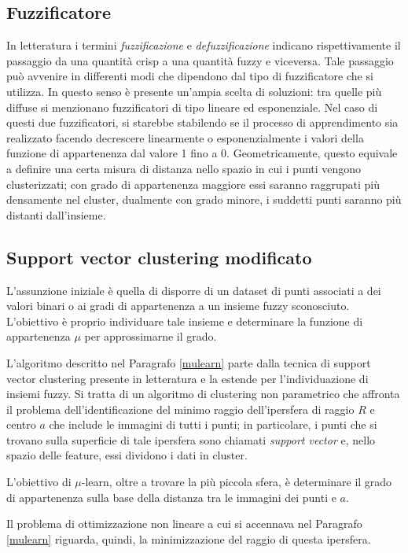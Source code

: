 \documentclass[12pt]{report}
\theoremstyle{definition}
\begin{document}
\subsection{Fuzzificatore} \label{fuzzificatore}
In letteratura i termini \textit{fuzzificazione} e \textit{defuzzificazione} indicano rispettivamente il passaggio da una quantità crisp a una quantità fuzzy e viceversa.
Tale passaggio può avvenire in differenti modi che dipendono dal tipo di fuzzificatore che si utilizza. In questo senso è presente un'ampia scelta di soluzioni: tra quelle più diffuse si menzionano fuzzificatori di tipo lineare ed esponenziale. Nel caso di questi due fuzzificatori, si starebbe stabilendo se il processo di apprendimento sia realizzato facendo decrescere linearmente o esponenzialmente i valori della funzione di appartenenza dal valore 1 fino a 0. Geometricamente, questo equivale a definire una certa misura di distanza nello spazio in cui i punti vengono clusterizzati; con grado di appartenenza maggiore essi saranno raggrupati più densamente nel cluster, dualmente con grado minore, i suddetti punti saranno più distanti dall'insieme.

\subsection{Support vector clustering modificato}
L'assunzione iniziale è quella di disporre di un dataset di punti associati a dei valori binari o ai gradi di appartenenza a un insieme fuzzy sconosciuto.
L'obiettivo è proprio individuare tale insieme e determinare la funzione di appartenenza $\mu$ per approssimarne il grado.

L'algoritmo descritto nel Paragrafo \ref{mulearn} parte dalla tecnica di support vector clustering presente in letteratura \cite{23} e la estende per l'individuazione di insiemi fuzzy. Si tratta di un algoritmo di clustering non parametrico che affronta il problema dell'identificazione del minimo raggio dell'ipersfera di raggio $R$ e centro $a$ che include le immagini di tutti i punti; in particolare, i punti che si trovano sulla superficie di tale ipersfera sono chiamati \textit{support vector} e, nello spazio delle feature, essi dividono i dati in cluster.

L'obiettivo di $\mu$-learn, oltre a trovare la più piccola sfera, è determinare il grado di appartenenza sulla base della distanza tra le immagini dei punti e $a$.

Il problema di ottimizzazione non lineare a cui si accennava nel Paragrafo \ref{mulearn} riguarda, quindi, la minimizzazione del raggio di questa ipersfera.
\end{document}
